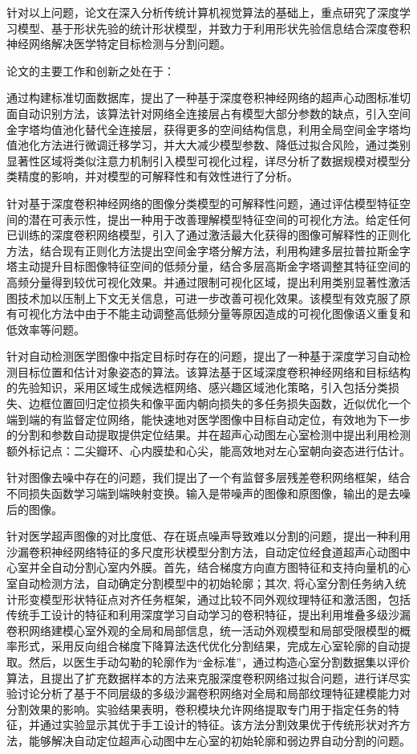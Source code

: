 针对以上问题，论文在深入分析传统计算机视觉算法的基础上，重点研究了深度学习模型、基于形状先验的统计形状模型，并致力于利用形状先验信息结合深度卷积神经网络解决医学特定目标检测与分割问题。

论文的主要工作和创新之处在于：

通过构建标准切面数据库，提出了一种基于深度卷积神经网络的超声心动图标准切面自动识别方法，该算法针对网络全连接层占有模型大部分参数的缺点，引入空间金字塔均值池化替代全连接层，获得更多的空间结构信息，利用全局空间金字塔均值池化方法进行微调迁移学习，并大大减少模型参数、降低过拟合风险，通过类别显著性区域将类似注意力机制引入模型可视化过程，详尽分析了数据规模对模型分类精度的影响，并对模型的可解释性和有效性进行了分析。

针对基于深度卷积神经网络的图像分类模型的可解释性问题，通过评估模型特征空间的潜在可表示性，提出一种用于改善理解模型特征空间的可视化方法。给定任何已训练的深度卷积网络模型，引入了通过激活最大化获得的图像可解释性的正则化方法，结合现有正则化方法提出空间金字塔分解方法，利用构建多层拉普拉斯金字塔主动提升目标图像特征空间的低频分量，结合多层高斯金字塔调整其特征空间的高频分量得到较优可视化效果。并通过限制可视化区域，提出利用类别显著性激活图技术加以压制上下文无关信息，可进一步改善可视化效果。该模型有效克服了原有可视化方法中由于不能主动调整高低频分量等原因造成的可视化图像语义重复和低效率等问题。

针对自动检测医学图像中指定目标时存在的问题，提出了一种基于深度学习自动检测目标位置和估计对象姿态的算法。该算法基于区域深度卷积神经网络和目标结构的先验知识，采用区域生成候选框网络、感兴趣区域池化策略，引入包括分类损失、边框位置回归定位损失和像平面内朝向损失的多任务损失函数，近似优化一个端到端的有监督定位网络，能快速地对医学图像中目标自动定位，有效地为下一步的分割和参数自动提取提供定位结果。并在超声心动图左心室检测中提出利用检测额外标记点：二尖瓣环、心内膜垫和心尖，能高效地对左心室朝向姿态进行估计。

针对图像去噪中存在的问题，我们提出了一个有监督多层残差卷积网络框架，结合不同损失函数学习端到端映射变换。输入是带噪声的图像和原图像，输出的是去噪后的图像。

针对医学超声图像的对比度低、存在斑点噪声导致难以分割的问题，提出一种利用沙漏卷积神经网络特征的多尺度形状模型分割方法，自动定位经食道超声心动图中心室并全自动分割心室内外膜。首先，结合梯度方向直方图特征和支持向量机的心室自动检测方法，自动确定分割模型中的初始轮廓；其次, 将心室分割任务纳入统计形变模型形状特征点对齐任务框架，通过比较不同外观纹理特征和激活图，包括传统手工设计的特征和利用深度学习自动学习的卷积特征，提出利用堆叠多级沙漏卷积网络建模心室外观的全局和局部信息，统一活动外观模型和局部受限模型的概率形式，采用反向组合梯度下降算法迭代优化分割结果，完成左心室轮廓的自动提取。然后，以医生手动勾勒的轮廓作为“金标准”，通过构造心室分割数据集以评价算法，且提出了扩充数据样本的方法来克服深度卷积网络过拟合问题，进行详尽实验讨论分析了基于不同层级的多级沙漏卷积网络对全局和局部纹理特征建模能力对分割效果的影响。实验结果表明，卷积模块允许网络提取专门用于指定任务的特征，并通过实验显示其优于手工设计的特征。该方法分割效果优于传统形状对齐方法，能够解决自动定位超声心动图中左心室的初始轮廓和弱边界自动分割的问题。


